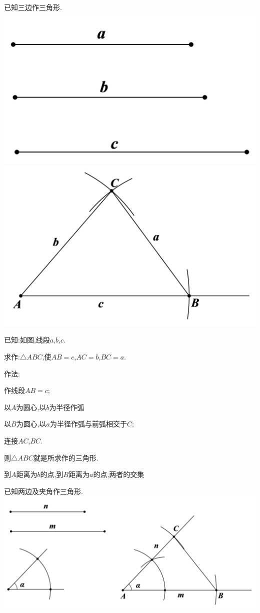 \documentclass[cn,blue,12pt]{elegantbook}
\begin{document}
\begin{zsyd}
\begin{zsyd}
    \item 已知三边作三角形.\\
        \includegraphics[width=0.4\linewidth]{pic/20200515010.png}
        \includegraphics[width=0.4\linewidth]{pic/20200515011.png}\\
        \begin{zsyd}
        \item 已知:如图,线段\(a\),\(b\),\(c.\)
        \item 求作:\( \triangle ABC\),使\(AB = c\),\(AC = b\),\(BC = a. \)
        \item 作法:
            \begin{zsyd}
            \item 作线段\(AB = c\);
            \item 以\(A\)为圆心,以\(b\)为半径作弧
            \item 以\(B\)为圆心,以\(a\)为半径作弧与前弧相交于\(C\);
            \item 连接\(AC\),\(BC.\)
            \item 则\(\triangle ABC\)就是所求作的三角形.
            \end{zsyd}
        \end{zsyd}
\begin{note}
            到\(A\)距离为\(b\)的点,到\(B\)距离为\(a\)的点,两者的交集
\end{note}
    \item 已知两边及夹角作三角形.\\
        \includegraphics[width=0.8\linewidth]{pic/20200515012.png}\\

\end{zsyd}
\end{zsyd}
\end{document}
